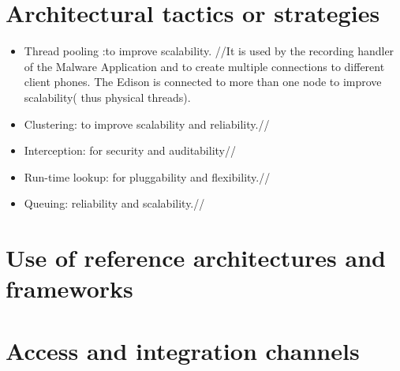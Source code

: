 \documentclass[a4paper,12pt,titlepage]{article}
\begin{document}
\newpage\section{Architectural tactics or strategies}
\begin{itemize}
\item Thread pooling :to improve scalability. //It is used by the recording handler of the Malware Application and to create multiple connections to different client phones. The Edison is connected to more than one node to improve scalability( thus physical threads).
\item Clustering: to improve scalability and reliability.//
\item Interception: for security and auditability//
\item Run-time lookup:  for pluggability and flexibility.//
\item Queuing: reliability and scalability.//
\end{itemize}

\newpage	\section{Use of reference architectures and frameworks}


\newpage	\section{Access and integration channels}
\end{document}
